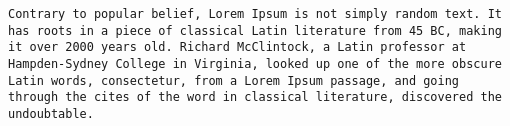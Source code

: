\documentclass[a4paper, 12pt]{article}
\newcommand{\morse}[1]{\noindent\lstinline[breaklines, breakindent=0mm]|#1|}
\begin{document}
	
	\morse{Contrary to popular belief, Lorem Ipsum is not simply random text. It has roots in a piece of classical Latin literature from 45 BC, making it over 2000 years old. Richard McClintock, a Latin professor at Hampden-Sydney College in Virginia, looked up one of the more obscure Latin words, consectetur, from a Lorem Ipsum passage, and going through the cites of the word in classical literature, discovered the undoubtable.}
\end{document}
